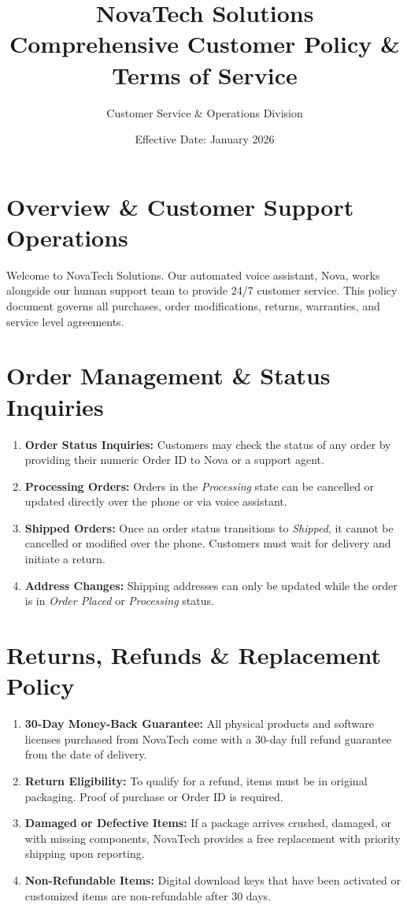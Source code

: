 \documentclass[11pt,a4paper]{article}
\title{\textbf{NovaTech Solutions \\ Comprehensive Customer Policy \& Terms of Service}}
\author{Customer Service \& Operations Division}
\date{Effective Date: January 2026}
\begin{document}
\maketitle

\section{Overview \& Customer Support Operations}
Welcome to NovaTech Solutions. Our automated voice assistant, Nova, works alongside our human support team to provide 24/7 customer service. This policy document governs all purchases, order modifications, returns, warranties, and service level agreements.

\section{Order Management \& Status Inquiries}
\begin{enumerate}[label=\arabic*.]
    \item \textbf{Order Status Inquiries:} Customers may check the status of any order by providing their numeric Order ID to Nova or a support agent.
    \item \textbf{Processing Orders:} Orders in the \textit{Processing} state can be cancelled or updated directly over the phone or via voice assistant.
    \item \textbf{Shipped Orders:} Once an order status transitions to \textit{Shipped}, it cannot be cancelled or modified over the phone. Customers must wait for delivery and initiate a return.
    \item \textbf{Address Changes:} Shipping addresses can only be updated while the order is in \textit{Order Placed} or \textit{Processing} status.
\end{enumerate}

\section{Returns, Refunds \& Replacement Policy}
\begin{enumerate}[label=\arabic*.]
    \item \textbf{30-Day Money-Back Guarantee:} All physical products and software licenses purchased from NovaTech come with a 30-day full refund guarantee from the date of delivery.
    \item \textbf{Return Eligibility:} To qualify for a refund, items must be in original packaging. Proof of purchase or Order ID is required.
    \item \textbf{Damaged or Defective Items:} If a package arrives crushed, damaged, or with missing components, NovaTech provides a free replacement with priority shipping upon reporting.
    \item \textbf{Non-Refundable Items:} Digital download keys that have been activated or customized items are non-refundable after 30 days.
\end{enumerate}
\end{document}

